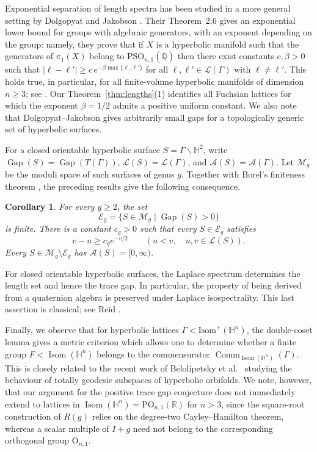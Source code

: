 \documentclass[reqno]{amsart}
\newtheorem{corollary}[theorem]{Corollary}
\theoremstyle{remark}
\DeclareMathOperator{\Comm}{Comm}
\DeclareMathOperator{\Gap}{Gap}
\DeclareMathOperator{\Isom}{Isom}
\newcommand{\R}{\mathbb R}
\newcommand{\Q}{\mathbb Q}
\newcommand{\HH}{\mathbb H}
\begin{document}
\noindent Exponential separation of length spectra has been studied in a more general setting by Dolgopyat and Jakobson \cite{DJ}. Their Theorem~2.6 gives an exponential lower bound for groups with algebraic generators, with an exponent depending on the group: namely, they prove that if $X$ is a hyperbolic manifold such that the generators of $\pi_1 (X)$ belong to $\mathrm{PSO}_{n,1}(\overline{\Q})$ then there exist constants $c, \beta > 0$ such that $|\ell-\ell'|\ge c\,e^{-\beta\max\{\ell,\ell'\}}$ for all $\ell,\ell'\in\mathcal L(\Gamma)$ with $\ell\ne\ell'$. This holds true, in particular, for all finite-volume hyperbolic manifolds of dimension $n \ge 3$; see \cite[Corollary 2.7]{DJ}. Our Theorem~\ref{thm:lengths}(1) identifies all Fuchsian lattices for which the exponent $\beta = 1/2$ admits a positive uniform constant. We also note that Dolgopyat--Jakobson \cite[Theorem~3.1]{DJ} gives arbitrarily small gaps for a topologically generic set of hyperbolic surfaces.

For a closed orientable hyperbolic surface $S=\Gamma\backslash\mathbb H^2$, write $\Gap(S)=\Gap(T(\Gamma))$, $\mathcal L(S)=\mathcal L(\Gamma)$, and $\mathcal A(S)=\mathcal A(\Gamma)$. Let $\mathcal M_g$ be the moduli space of such surfaces of genus $g$. Together with Borel's finiteness theorem \cite[Theorem 8.2]{Borel}, the preceding results give the following consequence.

\begin{corollary}\label{cor:moduli}
For every $g\ge2$, the set
$$
\mathcal E_g=\{S\in\mathcal M_g\mid \Gap(S)>0\}
$$
is finite. There is a constant $c_g>0$ such that every $S\in\mathcal E_g$ satisfies
$$
v-u\ge c_g e^{-v/2}
\qquad(u<v,\quad u,v\in\mathcal L(S)).
$$
Every $S\in\mathcal M_g\setminus\mathcal E_g$ has $\mathcal A(S)=[0,\infty)$.
\end{corollary}

For closed orientable hyperbolic surfaces, the Laplace spectrum determines the length set and hence the trace gap. In particular, the property of being derived from a quaternion algebra is preserved under Laplace isospectrality. This last assertion is classical; see Reid \cite[\S2 and Theorem 5.4]{Reid}.

Finally, we observe that for hyperbolic lattices $\Gamma < \mathrm{Isom}^+(\HH^n)$, the double-coset lemma gives a metric criterion which allows one to determine whether a finite group $F < \Isom(\HH^n) $ belongs to the commensurator $\Comm_{\Isom(\HH^n)}(\Gamma)$. This is closely related to the recent work of Belolipetsky et al.\ \cite{BBKS} studying the behaviour of totally geodesic subspaces of hyperbolic orbifolds. We note, however, that our argument for the positive trace gap conjecture does not immediately extend to lattices in $\operatorname{Isom}(\mathbb H^n) = \mathrm{PO}_{n,1}(\R)$ for $n>3$, since the square-root construction of $R(g)$ relies on the degree-two Cayley--Hamilton theorem, whereas a scalar multiple of $I+g$ need not belong to the corresponding orthogonal group $\mathrm{O}_{n,1}$.
\end{document}

